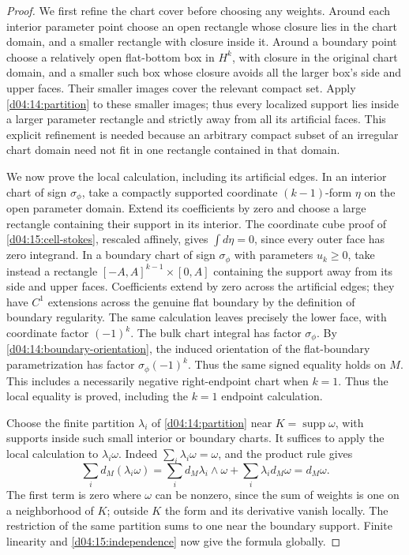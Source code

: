\documentclass[11pt,oneside,openany]{book}
\theoremstyle{definition}
\theoremstyle{remark}
\DeclareMathOperator{\supp}{supp}
\begin{document}
\begin{proof}
We first refine the chart cover before choosing any weights. Around each
interior parameter point choose an open rectangle whose closure lies in
the chart domain, and a smaller rectangle with closure inside it. Around
a boundary point choose a relatively open flat-bottom box in $H^k$, with
closure in the original chart domain, and a smaller such box whose closure
avoids all the larger box's side and upper faces. Their smaller images
cover the relevant compact set. Apply \cref{d04:14:partition} to these
smaller images; thus every localized support lies inside a larger parameter
rectangle and strictly away from all its artificial faces. This explicit
refinement is needed because an arbitrary compact subset of an irregular
chart domain need not fit in one rectangle contained in that domain.

We now prove the local calculation, including its artificial edges.
In an interior chart of sign $\sigma_\phi$, take a compactly supported coordinate
$(k-1)$-form $\eta$ on the open parameter domain. Extend its coefficients
by zero and choose a large rectangle containing their support in its
interior. The coordinate cube proof of \cref{d04:15:cell-stokes}, rescaled
affinely, gives $\int d\eta=0$, since every outer face has zero integrand.
In a boundary chart of sign $\sigma_\phi$ with parameters $u_k\ge0$, take instead a
rectangle $[-A,A]^{k-1}\times[0,A]$ containing the support away from its
side and upper faces. Coefficients extend by zero across the artificial
edges; they have $C^1$ extensions across the genuine flat boundary by the
definition of boundary regularity. The same calculation leaves precisely
the lower face, with coordinate factor $(-1)^k$. The bulk chart integral
has factor $\sigma_\phi$. By \cref{d04:14:boundary-orientation}, the
induced orientation of the flat-boundary parametrization has factor
$\sigma_\phi(-1)^k$. Thus the same signed equality holds on $M$.
This includes a necessarily negative right-endpoint chart when $k=1$.
Thus the local equality is proved, including the $k=1$
endpoint calculation.

Choose the finite partition $\lambda_i$ of
\cref{d04:14:partition} near $K=\supp\omega$, with supports inside such
small interior or boundary charts. It suffices to apply the local calculation
to $\lambda_i\omega$. Indeed $\sum_i\lambda_i\omega=\omega$, and the
product rule gives
\[
 \sum_i d_M(\lambda_i\omega)
 =\sum_i d_M\lambda_i\wedge\omega+\sum_i\lambda_i d_M\omega
 =d_M\omega.
\]
The first term is zero where $\omega$ can be nonzero, since the sum of
weights is one on a neighborhood of $K$; outside $K$ the form and its
derivative vanish locally. The restriction of the same partition sums to
one near the boundary support. Finite linearity and
\cref{d04:15:independence} now give the formula globally.


\end{proof}
\end{document}
